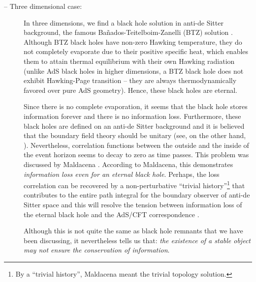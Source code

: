 \documentclass[12pt]{article}
\newcommand{\2}{$^2$}
\newcommand{\3}{$^3$}
\newcommand{\4}{$_4$}
\newcommand{\5}{$_5$}
\begin{document}
\begin{description}
\item[-- Three dimensional case:] In three dimensions, we find a black hole solution in anti-de Sitter background, the famous Ba\~{n}ados-Teitelboim-Zanelli (BTZ) solution \cite{Banados:1992wn}. Although BTZ black holes have non-zero Hawking temperature, they do not completely evaporate due to their positive specific heat, which enables them to attain thermal equilibrium with their own Hawking radiation (unlike AdS black holes in higher dimensions, a BTZ black hole does not exhibit Hawking-Page transition -- they are always thermodynamically favored over pure AdS geometry). Hence, these black holes are eternal. 

Since there is no complete evaporation, it seems that the black hole stores information forever and there is no information loss. Furthermore, these black holes are defined on an anti-de Sitter background and it is believed that the boundary field theory should be unitary \cite{Maldacena:1997re} (see, on the other hand, \cite{vafa}). Nevertheless, correlation functions between the outside and the inside of the event horizon seems to decay to zero as time passes. This problem was discussed by Maldacena \cite{Maldacena:2001kr}. According to Maldacena, this demonstrates \emph{information loss even for an eternal black hole}. Perhaps, the loss correlation can be recovered by a non-perturbative ``trivial history''\footnote{By a ``trivial history'', Maldacena meant the trivial topology solution. } that contributes to the entire path integral for the boundary observer of anti-de Sitter space and this will resolve the tension between information loss of the eternal black hole and the AdS/CFT correspondence \cite{Maldacena:1997re}.

Although this is not quite the same as black hole remnants that we have been discussing, it nevertheless tells us that: \emph{the existence of a stable object may not ensure the conservation of information}.
\end{description}

\end{document}
